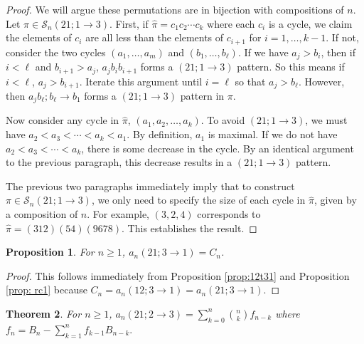 \documentclass[11pt]{article}
\newcommand{\ol}[1]{\overline{#1}}
\renewcommand\S{\mathcal S}
\newtheorem{theorem}{Theorem}[section]
\newtheorem{proposition}[theorem]{Proposition}
\theoremstyle{definition}
\begin{document}
\begin{proof}
    We will argue these permutations are in bijection with compositions of $n$. Let $\pi \in \S_n(21; 1 \to 3)$. First, if $\hat\pi = c_1c_2\cdots c_k$ where each $c_i$ is a cycle, we claim the elements of $c_i$ are all less than the elements of $c_{i+1}$ for $i = 1,\dots, k-1$. If not, consider the two cycles $(a_1,\dots,a_m)$ and $(b_1,\dots,b_\ell)$. If we have $a_j > b_i$, then if $i < \ell$ and $b_{i+1} > a_j$, $a_j b_i b_{i+1}$ forms a $(21; 1 \to 3)$ pattern. So this means if $i < \ell$, $a_j > b_{i+1}$. Iterate this argument until $i = \ell$ so that $a_j > b_\ell$. However, then $a_j b_\ell; b_\ell \to b_1$ forms a $(21; 1 \to 3)$ pattern in $\pi$.
    
    Now consider any cycle in $\hat\pi$, $(a_1,a_2,\dots,a_k)$. To avoid $(21; 1 \to 3)$, we must have $a_2 < a_3 < \cdots < a_k < a_1$. By definition, $a_1$ is maximal. If we do not have $a_2 < a_3 < \cdots < a_k$, there is some decrease in the cycle. By an identical argument to the previous paragraph, this decrease results in a $(21; 1 \to 3)$ pattern.
    
    The previous two paragraphs immediately imply that to construct $\pi \in \S_n(21; 1 \to 3)$, we only need to specify the size of each cycle in $\hat\pi$, given by a composition of $n$. For example, $(3,2,4)$ corresponds to $\hat\pi = (312)(54)(9678)$. This establishes the result.
\end{proof}

\begin{proposition}\label{prop: 21t31}
    For $n \geq 1$, $a_n(21;3 \to 1) = C_n$.
\end{proposition}

\begin{proof}
    This follows immediately from Proposition \ref{prop:12t31} and Proposition \ref{prop: rc1} because $C_n = a_n(12;3\to1) = a_n(21;3\to1)$.
\end{proof}

\begin{theorem}\label{thm: 21t23}
    For $n \geq 1$, $a_n(21; 2 \to 3) =  \sum_{k=0}^n \binom{n}{k} f_{n-k}$ where  $f_n = B_n - \sum_{k=1}^n f_{k-1}B_{n-k}.$%
\end{theorem}
\end{document}
